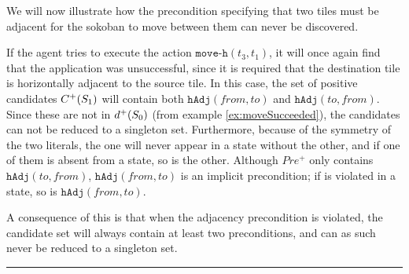 \documentclass[\master/Master.tex]{subfiles}
\begin{document}
\begin{example} \label{ex:undisc}
    We will now illustrate how the precondition specifying that two tiles must be adjacent for the sokoban to move between them can never be discovered.

    If the agent tries to execute the action $\texttt{move-h}(t_3, t_1)$, it will once again find that the application was unsuccessful, since it is required that the destination tile is horizontally adjacent to the source tile. In this case, the set of positive candidates $C^+(S_1)$ will contain both $\texttt{hAdj}(from, to)$ and $\texttt{hAdj}(to, from)$. Since these are not in $d^+(S_0)$ (from example \ref{ex:moveSucceeded}), the candidates can not be reduced to a singleton set. Furthermore, because of the symmetry of the two literals, the one will never appear in a state without the other, and if one of them is absent from a state, so is the other. Although $Pre^+$ only contains $\texttt{hAdj}(to, from)$, $\texttt{hAdj}(from, to)$ is an implicit precondition; if is violated in a state, so is $\texttt{hAdj}(from, to)$.

    A consequence of this is that when the adjacency precondition is violated, the candidate set will always contain at least two preconditions, and can as such never be reduced to a singleton set.

    \noindent\rule{\textwidth}{1pt}
\end{example}
\end{document}
